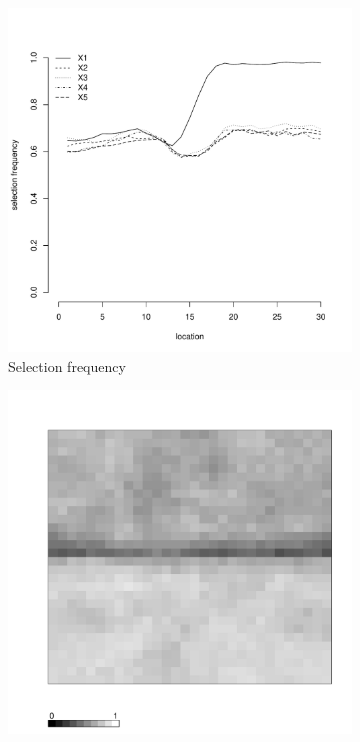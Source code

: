 \documentclass[authoryear, review, 11pt]{elsarticle}
\begin{document}
\begin{figure}
\begin{subfigure}[b]{0.45\textwidth}
		\includegraphics[width=\textwidth]{../../figures/simulation/15.17.profile_selection.pdf}
		\caption{Selection frequency}
	\end{subfigure}
	\begin{subfigure}[b]{0.45\textwidth}
	\centering
		\includegraphics[width=\textwidth]{../../figures/simulation/X1.15.17.unshrunk_bootstrap_coverage.pdf}

\end{subfigure}
\end{figure}
\end{document}
